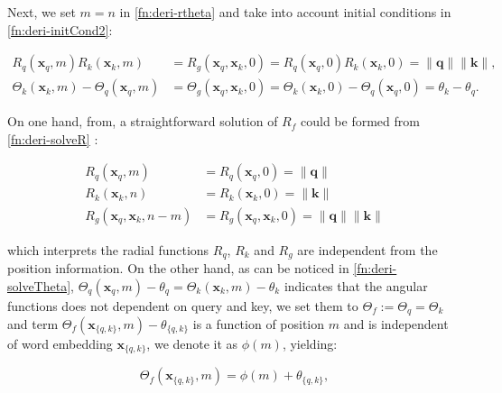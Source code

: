 Next, we set $m=n$ in \ref{fn:deri-rtheta} and take into account initial conditions in \ref{fn:deri-initCond2}:

\begin{subequations}
	\begin{align}
		R_q({\boldsymbol x}_q, m)R_k({\boldsymbol x}_k, m) &= R_g({\boldsymbol x}_q, {\boldsymbol x}_k, 0) = R_q({\boldsymbol x}_q, 0)R_k({\boldsymbol x}_k, 0)  = \|{\boldsymbol q}\|\|{\boldsymbol k}\| \label{fn:deri-solveR},\\
		\Theta_k({\boldsymbol x}_k, m) - \Theta_q({\boldsymbol x}_q, m) &= \Theta_g({\boldsymbol x}_q, {\boldsymbol x}_k, 0) =\Theta_k({\boldsymbol x}_k, 0) - \Theta_q({\boldsymbol x}_q, 0) =  \theta_k - \theta_q \label{fn:deri-solveTheta}.
	\end{align}
\end{subequations}

On one hand, from, a straightforward solution of $R_f$ could be formed from \ref{fn:deri-solveR} :

\begin{equation}
	\begin{aligned}
		R_q({\boldsymbol x}_q, m) &= R_q({\boldsymbol x}_q, 0) =  \|{\boldsymbol q}\| \\
		R_k({\boldsymbol x}_k, n) &= R_k({\boldsymbol x}_k, 0) = \|{\boldsymbol k}\|\\
		R_g({\boldsymbol x}_q, {\boldsymbol x}_k, n - m) &= R_g({\boldsymbol x}_q, {\boldsymbol x}_k, 0) =  \|{\boldsymbol q}\|\|{\boldsymbol k}\|
	\end{aligned}
	\label{fn:deri-solR1}
\end{equation}

which interprets the radial functions $R_q$, $R_k$ and $R_g$ are independent from the position information. On the other hand, as can be noticed in \ref{fn:deri-solveTheta},  $\Theta_q({\boldsymbol x}_q, m) - \theta_q = \Theta_k({\boldsymbol x}_k, m) - \theta_k$ indicates that the angular functions does not dependent on query and key, we set them to  $\Theta_f := \Theta_q = \Theta_k$ and term $\Theta_f({\boldsymbol x}_{\{q, k\}}, m) - \theta_{\{q, k\}}$ is a function of position $m$ and is independent of word embedding ${\boldsymbol x}_{\{q, k\}}$, we denote it as $\phi(m)$, yielding:

\begin{equation}
	\Theta_f({\boldsymbol x}_{\{q, k\}}, m) = \phi(m) + \theta_{\{q,k\}},
	\label{fn:deri-solTheta1}
\end{equation}

